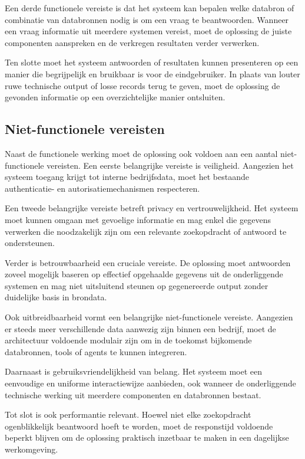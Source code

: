 Een derde functionele vereiste is dat het systeem kan bepalen welke databron of combinatie van databronnen nodig is om een vraag te beantwoorden. Wanneer een vraag informatie uit meerdere systemen vereist, moet de oplossing de juiste componenten aanspreken en de verkregen resultaten verder verwerken.

Ten slotte moet het systeem antwoorden of resultaten kunnen presenteren op een manier die begrijpelijk en bruikbaar is voor de eindgebruiker. In plaats van louter ruwe technische output of losse records terug te geven, moet de oplossing de gevonden informatie op een overzichtelijke manier ontsluiten.

\subsection{Niet-functionele vereisten}
\label{subsec:niet-functionele-vereisten}

Naast de functionele werking moet de oplossing ook voldoen aan een aantal niet-functionele vereisten. Een eerste belangrijke vereiste is veiligheid. Aangezien het systeem toegang krijgt tot interne bedrijfsdata, moet het bestaande authenticatie- en autorisatiemechanismen respecteren.

Een tweede belangrijke vereiste betreft privacy en vertrouwelijkheid. Het systeem moet kunnen omgaan met gevoelige informatie en mag enkel die gegevens verwerken die noodzakelijk zijn om een relevante zoekopdracht of antwoord te ondersteunen.

Verder is betrouwbaarheid een cruciale vereiste. De oplossing moet antwoorden zoveel mogelijk baseren op effectief opgehaalde gegevens uit de onderliggende systemen en mag niet uitsluitend steunen op gegenereerde output zonder duidelijke basis in brondata.

Ook uitbreidbaarheid vormt een belangrijke niet-functionele vereiste. Aangezien er steeds meer verschillende data aanwezig zijn binnen een bedrijf, moet de architectuur voldoende modulair zijn om in de toekomst bijkomende databronnen, tools of agents te kunnen integreren.

Daarnaast is gebruiksvriendelijkheid van belang. Het systeem moet een eenvoudige en uniforme interactiewijze aanbieden, ook wanneer de onderliggende technische werking uit meerdere componenten en databronnen bestaat.

Tot slot is ook performantie relevant. Hoewel niet elke zoekopdracht ogenblikkelijk beantwoord hoeft te worden, moet de responstijd voldoende beperkt blijven om de oplossing praktisch inzetbaar te maken in een dagelijkse werkomgeving.
